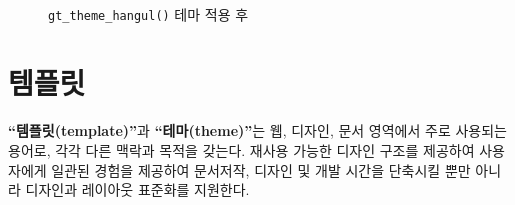 \documentclass[
  letterpaper,
]{book}
\begin{document}
\begin{figure}
\begin{minipage}[t]{0.49\linewidth}
{}

\end{minipage}%
%
\begin{minipage}[t]{0.01\linewidth}

{\centering 

~

}

\end{minipage}%
%
\begin{minipage}[t]{0.49\linewidth}

{\centering 


\caption{\texttt{gt\_theme\_hangul()} 테마 적용 후}

}

\end{minipage}%

\end{figure}

\hypertarget{uxd15cuxd50cuxb9bf}{%
\chapter{템플릿}\label{uxd15cuxd50cuxb9bf}}

\textbf{``템플릿(template)''}과 \textbf{``테마(theme)''}는 웹, 디자인,
문서 영역에서 주로 사용되는 용어로, 각각 다른 맥락과 목적을 갖는다.
재사용 가능한 디자인 구조를 제공하여 사용자에게 일관된 경험을 제공하여
문서저작, 디자인 및 개발 시간을 단축시킬 뿐만 아니라 디자인과 레이아웃
표준화를 지원한다.
\end{document}
